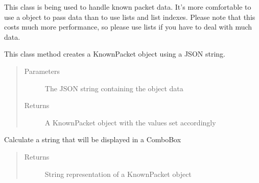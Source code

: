 \documentclass[letterpaper,10pt,english]{sphinxmanual}
\begin{document}
\begin{fulllineitems}
\label{\detokenize{src:src.KnownPacket.KnownPacket}}
This class is being used to handle known packet data.
It’s more comfortable to use a object to pass data
than to use lists and list indexes. Please note that
this costs much more performance, so please use lists
if you have to deal with much data.

\begin{fulllineitems}
\label{\detokenize{src:src.KnownPacket.KnownPacket.__init__}}
\end{fulllineitems}


\begin{fulllineitems}
\label{\detokenize{src:src.KnownPacket.KnownPacket.fromJSON}}
This class method creates a KnownPacket object using a JSON string.
\begin{quote}\begin{description}
\item[{Parameters}] \leavevmode
{} \textendash{} The JSON string containing the object data

\item[{Returns}] \leavevmode
A KnownPacket object with the values set accordingly

\end{description}\end{quote}

\end{fulllineitems}


\begin{fulllineitems}
\label{\detokenize{src:src.KnownPacket.KnownPacket.toComboBoxString}}
Calculate a string that will be displayed in a ComboBox
\begin{quote}\begin{description}
\item[{Returns}] \leavevmode
String representation of a KnownPacket object


\end{description}
\end{quote}
\end{fulllineitems}
\end{fulllineitems}
\end{document}
